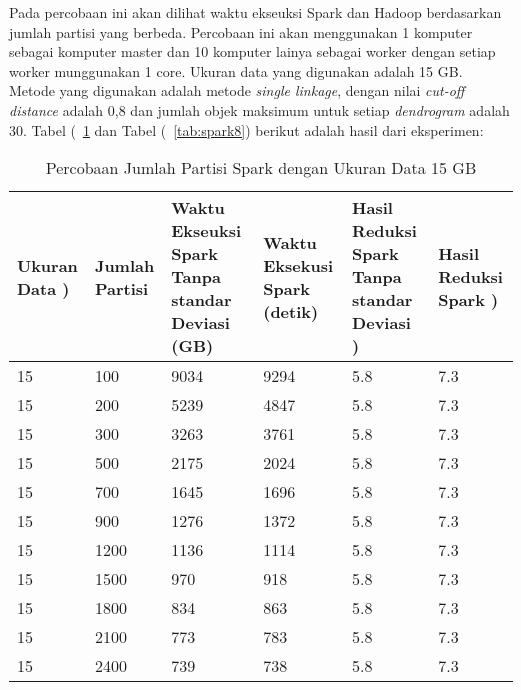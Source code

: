 

Pada percobaan ini akan dilihat waktu ekseuksi Spark dan Hadoop berdasarkan jumlah partisi yang berbeda. Percobaan ini akan menggunakan 1 komputer sebagai komputer master dan 10 komputer lainya sebagai worker dengan setiap worker munggunakan 1 core. Ukuran data yang digunakan adalah 15 GB. Metode yang digunakan adalah metode \textit{single linkage}, dengan nilai \textit{cut-off distance} adalah 0,8 dan jumlah objek maksimum untuk setiap \textit{dendrogram} adalah 30. Tabel (~\ref{tab:spark7} dan Tabel (~\ref{tab:spark8}) berikut adalah hasil dari eksperimen:

\begin{table}[H] 
	\centering 
	\caption{Percobaan Jumlah Partisi Spark dengan Ukuran Data 15 GB}
	\label{tab:spark7}
	\begin{tabular}{|p{1cm}|p{1cm}|p{3cm}|p{3cm}|p{3cm}|p{3cm}|}
\hline
Ukuran Data ) & Jumlah Partisi &  Waktu Ekseuksi Spark Tanpa standar Deviasi (GB) & Waktu Eksekusi Spark (detik) & Hasil Reduksi Spark Tanpa standar Deviasi ) & Hasil Reduksi Spark )  \\ 
\hline
15 & 100 & 9034  & 9294  &  5.8 & 7.3 \\
\hline
15 & 200 & 5239  & 4847  & 5.8 & 7.3 \\
\hline
15 & 300 & 3263  & 3761  & 5.8 & 7.3 \\
\hline
15 & 500 & 2175  & 2024  &  5.8 & 7.3 \\
\hline
15 & 700 & 1645  & 1696  & 5.8 & 7.3 \\
\hline
15 & 900 & 1276  & 1372  & 5.8 & 7.3 \\
\hline
15 & 1200 & 1136  & 1114  & 5.8 & 7.3 \\
\hline
15 & 1500 & 970  & 918  & 5.8 & 7.3 \\
\hline
15 & 1800 & 834  & 863  & 5.8 & 7.3 \\
\hline
15 & 2100 & 773  & 783  & 5.8 & 7.3 \\
\hline
15 & 2400 & 739  & 738  & 5.8 & 7.3 \\
\hline

\hline

	\end{tabular} 
\end{table}



